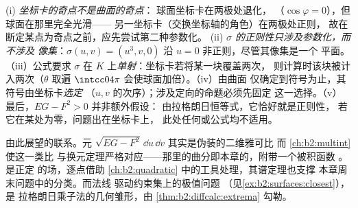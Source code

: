 \begin{remark}[常见误区]
(i) \emph{坐标卡的奇点不是曲面的奇点}：
球面坐标卡在两极处退化，
（$\cos\varphi = 0$），但球面在那里完全光滑——
另一坐标卡（交换坐标轴的角色）在两极处正则，
故在断定某点为奇点之前，应先尝试第二种参数化。
(ii) \emph{$\sigma$ 的正则性只涉及参数化，而不涉及
像集}：$\sigma(u, v) = (u^3, v,
0)$ 沿 $u = 0$ 非正则，尽管其像集是一个
平面。（iii）公式要求 $\sigma$
在 $K$ 上\emph{单射}：坐标卡若将某一块覆盖两次，
则计算时该块被计入两次（$\theta$ 取遍 $\intcc0{4\pi}$
会使球面加倍）。（iv）由曲面
仅确定到符号为止，其符号由坐标卡\emph{选定}
（$u, v$ 的次序）；涉及定向的命题必须先固定
这一选择。（v）最后，$EG - F^2 > 0$ 并非额外假设：
由拉格朗日恒等式，它恰好就是正则性，
若它在某处为零，问题出在坐标卡上，
此处任何或公式均不适用。
\end{remark}

\begin{remark}[本卷的其他视角]
由此展望的联系。元 $\sqrt{EG -
F^2}\,\dd u\,\dd v$ 其实是伪装的二维雅可比
而 \cref{ch:b2:multint} 使这一类比
与换元定理严格对应——那里的曲分即本章的，附带一个被积函数
。是正定
的场，逐点借助
\cref{ch:b2:quadratic} 中的工具处理，其谱定理也支撑
本章周末问题中的分类。而法线
驱动约束集上的极值问题
（见\cref{ex:b2:surfaces:closest}），是
拉格朗日乘子法的几何雏形，由
\cref{thm:b2:diffcalc:extrema} 勾勒。
\end{remark}

